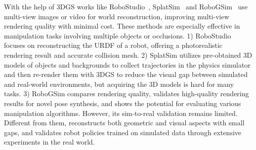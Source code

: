 With the help of 3DGS works like RoboStudio~\citep{robostudio}, SplatSim~\citep{qureshi2024splatsim}
and RoboGSim~\citep{li2024robogsim} use multi-view images or video for world reconstruction, improving multi-view rendering quality with minimal cost. These methods are especially effective in manipulation tasks involving multiple objects or occlusions. 1) RoboStudio focuses on reconstructing the URDF of a robot, offering a photorealistic rendering result and accurate collision mesh.
2) SplatSim utilizes pre-obtained 3D models of objects and backgrounds to collect trajectories in the physics simulator and then re-render them with 3DGS to reduce the visual gap between simulated and real-world environments, but acquiring the 3D models is hard for many tasks. 
3) RoboGSim compares rendering quality, validates high-quality rendering results for novel pose synthesis, and shows the potential for evaluating various manipulation algorithms. However, its sim-to-real validation remains limited.
Different from them, \our reconstructs both geometric and visual aspects with small gaps, and validates robot policies trained on simulated data through extensive experiments in the real world.












